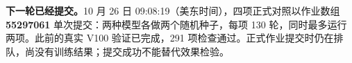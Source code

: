 \par\textbf{下一轮已经提交。}10 月 26 日 09:08:19（美东时间），四项正式对照以作业数组 \textbf{55297061} 单次提交：两种模型各做两个随机种子，每项 130 轮，同时最多运行两项。此前的真实 V100 验证已完成，291 项检查通过。正式作业提交时仍在排队，尚没有训练结果；提交成功不能替代效果检验。

